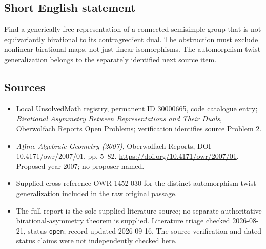\documentclass[11pt]{article}
\begin{document}
\subsection{Short English statement}
Find a generically free representation of a connected semisimple group that is not equivariantly birational to its contragredient dual. The obstruction must exclude nonlinear birational maps, not just linear isomorphisms. The automorphism-twist generalization belongs to the separately identified next source item.
\subsection{Sources}
\begin{itemize}\item Local UnsolvedMath registry, permanent ID 30000665, code catalogue entry; \emph{Birational Asymmetry Between Representations and Their Duals}, Oberwolfach Reports Open Problems; verification identifies source Problem 2.\item \emph{Affine Algebraic Geometry (2007)}, Oberwolfach Reports, DOI 10.4171/owr/2007/01, pp. 5--82. \url{https://doi.org/10.4171/owr/2007/01}. Proposed year 2007; no proposer named.\item Supplied cross-reference OWR-1452-030 for the distinct automorphism-twist generalization included in the raw original passage.\item The full report is the sole supplied literature source; no separate authoritative birational-asymmetry theorem is supplied. Literature triage checked 2026-08-21, status \texttt{open}; record updated 2026-09-16. The source-verification and dated status claims were not independently checked here.\end{itemize}
\end{document}
